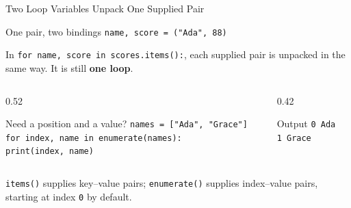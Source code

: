 \documentclass[aspectratio=169,10pt]{beamer}
\begin{document}
\begin{frame}{Two Loop Variables Unpack One Supplied Pair}
  \small
  \begin{block}{One pair, two bindings}
    \texttt{name, score = ("Ada", 88)}
  \end{block}
  In \texttt{for name, score in scores.items():}, each supplied pair is unpacked in the same way. It is still \textbf{one loop}.
  \begin{columns}[T,onlytextwidth]
    \begin{column}{0.52\textwidth}
      \begin{block}{Need a position and a value?}
        \texttt{names = ["Ada", "Grace"]}\\
        \texttt{for index, name in enumerate(names):}\\
        \hspace{0.18in}\texttt{print(index, name)}
      \end{block}
    \end{column}
    \begin{column}{0.42\textwidth}
      \begin{block}{Output}
        \texttt{0 Ada}\\
        \texttt{1 Grace}
      \end{block}
    \end{column}
  \end{columns}
  \begin{keyidea}
    \texttt{items()} supplies key--value pairs; \texttt{enumerate()} supplies index--value pairs, starting at index \texttt{0} by default.
  \end{keyidea}
\end{frame}
\end{document}
